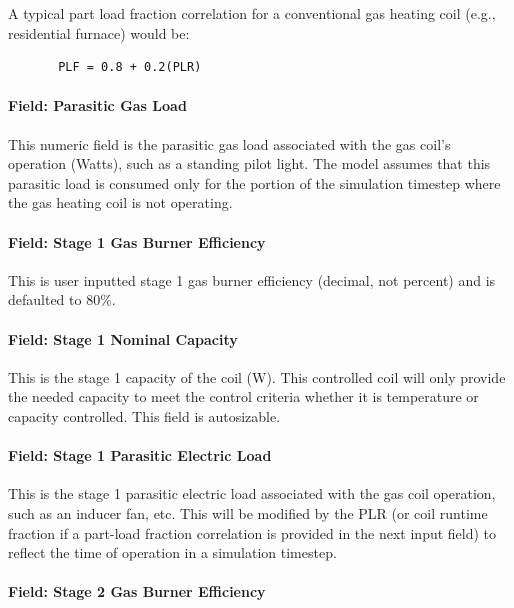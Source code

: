 A typical part load fraction correlation for a conventional gas heating coil (e.g., residential furnace) would be:

\begin{lstlisting}
       PLF = 0.8 + 0.2(PLR)
\end{lstlisting}

\paragraph{Field: Parasitic Gas Load}\label{field-parasitic-gas-load-1}

This numeric field is the parasitic gas load associated with the gas coil's operation (Watts), such as a standing pilot light. The model assumes that this parasitic load is consumed only for the portion of the simulation timestep where the gas heating coil is not operating.

\paragraph{Field: Stage 1 Gas Burner Efficiency}\label{field-stage-1-gas-burner-efficiency}

This is user inputted stage 1 gas burner efficiency (decimal, not percent) and is defaulted to 80\%.

\paragraph{Field: Stage 1 Nominal Capacity}\label{field-stage-1-nominal-capacity-1}

This is the stage 1 capacity of the coil (W). This controlled coil will only provide the needed capacity to meet the control criteria whether it is temperature or capacity controlled. This field is autosizable.

\paragraph{Field: Stage 1 Parasitic Electric Load}\label{field-stage-1-parasitic-electric-load}

This is the stage 1 parasitic electric load associated with the gas coil operation, such as an inducer fan, etc. This will be modified by the PLR (or coil runtime fraction if a part-load fraction correlation is provided in the next input field) to reflect the time of operation in a simulation timestep.

\paragraph{Field: Stage 2 Gas Burner Efficiency}\label{field-stage-2-gas-burner-efficiency}

